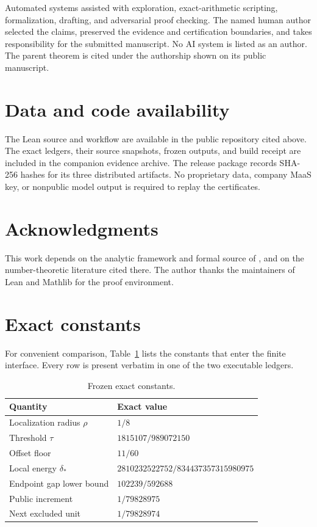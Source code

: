 \documentclass[11pt,reqno]{amsart}
\theoremstyle{definition}
\theoremstyle{remark}
\begin{document}
Automated systems assisted with exploration, exact-arithmetic scripting,
formalization, drafting, and adversarial proof checking.  The named human
author selected the claims, preserved the evidence and certification
boundaries, and takes responsibility for the submitted manuscript.  No AI
system is listed as an author.  The parent theorem is cited under the
authorship shown on its public manuscript.

\section*{Data and code availability}

The Lean source and workflow are available in the public repository cited
above.  The exact ledgers, their source snapshots, frozen outputs, and build
receipt are included in the companion evidence archive.  The release package
records SHA-256 hashes for its three distributed artifacts.  No proprietary
data, company MaaS key, or nonpublic model output is required to replay the
certificates.

\section*{Acknowledgments}

This work depends on the analytic framework and formal source of
\cite{Claude2026}, and on the number-theoretic literature cited there.  The
author thanks the maintainers of Lean and Mathlib for the proof environment.




\appendix

\section{Exact constants}

For convenient comparison, Table~\ref{tab:constants} lists the constants
that enter the finite interface.  Every row is present verbatim in one of the
two executable ledgers.

\begin{table}[ht]
\centering
\caption{Frozen exact constants.}\label{tab:constants}
\begin{tabular}{@{}ll@{}}
\toprule
Quantity & Exact value \\
\midrule
Localization radius $\rho$ & $1/8$ \\
Threshold $\tau$ & $1815107/989072150$ \\
Offset floor & $11/60$ \\
Local energy $\delta_*$ & $2810232522752/834437357315980975$ \\
Endpoint gap lower bound & $102239/592688$ \\
Public increment & $1/79828975$ \\
Next excluded unit & $1/79828974$ \\
\bottomrule
\end{tabular}
\end{table}
\end{document}
